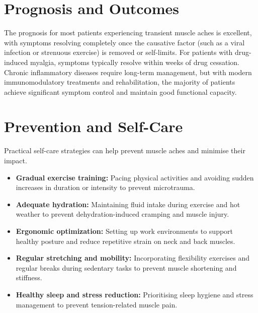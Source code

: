 \section*{Prognosis and Outcomes}
The prognosis for most patients experiencing transient muscle aches is excellent, with symptoms resolving completely once the causative factor (such as a viral infection or strenuous exercise) is removed or self-limits. For patients with drug-induced myalgia, symptoms typically resolve within weeks of drug cessation. Chronic inflammatory diseases require long-term management, but with modern immunomodulatory treatments and rehabilitation, the majority of patients achieve significant symptom control and maintain good functional capacity.

\section*{Prevention and Self-Care}
Practical self-care strategies can help prevent muscle aches and minimise their impact.
\begin{itemize}
    \item \textbf{Gradual exercise training:} Pacing physical activities and avoiding sudden increases in duration or intensity to prevent microtrauma.
    \item \textbf{Adequate hydration:} Maintaining fluid intake during exercise and hot weather to prevent dehydration-induced cramping and muscle injury.
    \item \textbf{Ergonomic optimization:} Setting up work environments to support healthy posture and reduce repetitive strain on neck and back muscles.
    \item \textbf{Regular stretching and mobility:} Incorporating flexibility exercises and regular breaks during sedentary tasks to prevent muscle shortening and stiffness.
    \item \textbf{Healthy sleep and stress reduction:} Prioritising sleep hygiene and stress management to prevent tension-related muscle pain.
\end{itemize}

